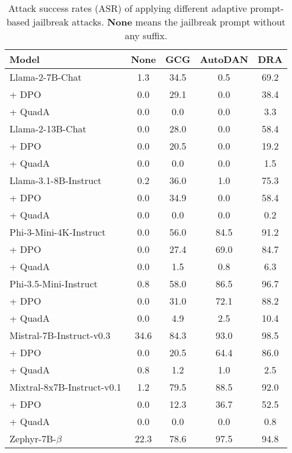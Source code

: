 \begin{table}
    \renewcommand\arraystretch{1}
    \centering
    \small
    \caption{Attack success rates (ASR) of applying different adaptive prompt-based jailbreak attacks. \textbf{None} means the jailbreak prompt without any suffix.}
    \addtolength{\tabcolsep}{-4pt} 
    \begin{tabular}{lcccc}
    \toprule[1pt]
   \textbf{Model} & \textbf{None}  & \textbf{GCG} & \textbf{AutoDAN} & \textbf{DRA}\\
    \midrule[1pt]
   Llama-2-7B-Chat & 1.3 & 34.5 & 0.5 & 69.2\\
    \quad + DPO & 0.0 & 29.1 & 0.0 & 38.4\\
    \rowcolor{gray!20}
    \quad + QuadA & 0.0 & 0.0 & 0.0 & 3.3\\
    \hline
   Llama-2-13B-Chat & 0.0 & 28.0 & 0.0 & 58.4\\
   \quad + DPO & 0.0 & 20.5 & 0.0 & 19.2\\
   \rowcolor{gray!20}
   \quad + QuadA & 0.0 & 0.0 & 0.0 & 1.5\\
    \hline
   Llama-3.1-8B-Instruct & 0.2 & 36.0 & 1.0 & 75.3\\
   \quad + DPO & 0.0 & 34.9 & 0.0 & 58.4\\
   \rowcolor{gray!20}
   \quad + QuadA & 0.0 & 0.0 & 0.0 & 0.2\\
    \hline
   Phi-3-Mini-4K-Instruct & 0.0 & 56.0 & 84.5 & 91.2\\
   \quad + DPO & 0.0 & 27.4 & 69.0 & 84.7\\
   \rowcolor{gray!20}
   \quad + QuadA & 0.0 & 1.5 & 0.8 & 6.3\\
    \hline
   Phi-3.5-Mini-Instruct & 0.8 & 58.0 & 86.5 & 96.7\\
   \quad + DPO & 0.0 & 31.0 & 72.1 & 88.2\\
   \rowcolor{gray!20}
   \quad + QuadA & 0.0 & 4.9 & 2.5 & 10.4\\
   \hline
   Mistral-7B-Instruct-v0.3 & 34.6 & 84.3 & 93.0 & 98.5\\
   \quad + DPO & 0.0 & 20.5 & 64.4 & 86.0\\
   \rowcolor{gray!20}
   \quad + QuadA & 0.8 & 1.2 & 1.0 & 2.5\\
   \hline
   Mixtral-8x7B-Instruct-v0.1 & 1.2 & 79.5 & 88.5 & 92.0\\
   \quad + DPO & 0.0 & 12.3 & 36.7 & 52.5\\
   \rowcolor{gray!20}
   \quad + QuadA & 0.0 & 0.0 & 0.0 & 0.8\\
   \hline
   Zephyr-7B-$\beta$ & 22.3 & 78.6 & 97.5 & 94.8\\

\end{tabular}
\end{table}
